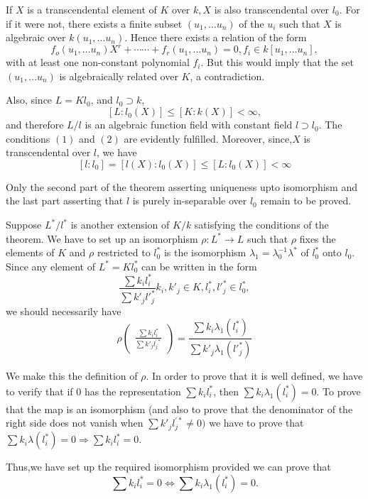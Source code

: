 If $X$ is a transcendental element of $K$ over $k, X$ is also
transcendental over $l_0$. For if it were not, there exists a finite
subset $(u_1, \ldots u_n)$ of the $u_i$ such that $X$ is algebraic
over $k(u_1, \ldots u_n)$. Hence there exists a relation of the form 
$$
f_o (u_1, \ldots u_n) X^r + \cdots \cdots + f_r (u_1 , \ldots u_n) =
0, f_i \in k[u_1 , \ldots u_n], 
$$
with at least one non-constant polynomial $f_i$. But this would imply
that the set $(u_1, \ldots u_n)$ is algebraically related over $K$, a
contradiction. 

Also, since $L = Kl_0$, and $l_0 \supset k$,
$$
[L : l_0 (X)] \le [ K : k(X) ] < \infty,
$$
and therefore $L/l$ is an algebraic function field with constant
field $l \supset l_0$. The conditions $(1)$ and $(2)$ are evidently
fulfilled. Moreover, since,\pageoriginale $X$ is transcendental over $l$, we have 
$$
[l : l_0] = [l(X) : l_0 (X)] \le [L : l_0 (X)] < \infty
$$

Only the second part of the theorem asserting uniqueness upto
isomorphism and the last part asserting that $l$ is purely
in-separable over $l_0$ remain to be proved. 

Suppose $L^*/l^*$ is another extension of $K/k$ satisfying the
conditions of the theorem. We have to set up an isomorphism $\rho :
L^* \to L$ such that $\rho$ fixes the elements of $K$ and $\rho$
restricted to $l^*_0$ is the isomorphism $\lambda_1 = \lambda^{-1}_0 \lambda^*$
of $l^*_0$ onto $l_0$. Since any element of $L^* = Kl_0^*$ can be
written in the form 
$$
\frac{\sum k_i l^*_i}{\sum k'_j l'^{*}_j} k_i, k'_j \in K, l^*_i,
l'^{*}_j \in l^*_0, 
$$
we should necessarily have
$$
\rho 
\begin{pmatrix} 
  \frac{\sum k_i l^*_i}{\sum k'_j l^{' *}_j}
\end{pmatrix}
= \frac{\sum k_i \lambda_1 (l^*_i)}{\sum k'_j \lambda_1 (l'^{*}_j)}
$$

We make this the definition of $\rho$. In order to prove that it is
well defined, we have to verify that if $0$ has the representation
$\sum k_i l^*_i$, then $\sum k_i \lambda_1 (l^*_i) = 0$. To prove that
the map is an isomorphism (and also to prove that the denominator of
the right side does not vanish when $\sum k'_j l^{' *}_j \neq 0)$ we
have to prove that $\sum k_i \lambda (l_i^*) = 0 \Rightarrow \sum k_i
l^*_i = 0$. 

Thus,\pageoriginale we have set up the required isomorphism provided we can prove that
$$
\sum k_i l_i^* = 0 \Leftrightarrow \sum k_i \lambda_1 (l^*_i) = 0. 
$$

